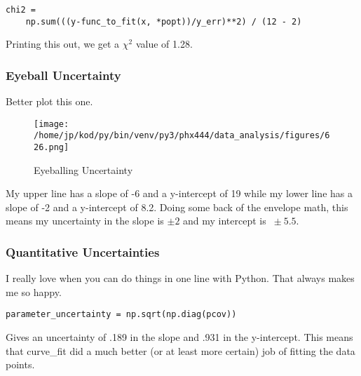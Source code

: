 \documentclass{article}
\begin{document}
\begin{center}
\begin{minipage}[t]{.85\textwidth}
    \begin{verbatim}
chi2 = 
    np.sum(((y-func_to_fit(x, *popt))/y_err)**2) / (12 - 2)
\end{verbatim}
\end{minipage}
\end{center}

Printing this out, we get a $\chi^2$ value of 1.28.

\subsubsection{Eyeball Uncertainty}
Better plot this one.
\begin{figure}[H]
        \begin{center}
        \texttt{[image: /home/jp/kod/py/bin/venv/py3/phx444/data\_analysis/figures/626.png]}
        \caption{Eyeballing Uncertainty}
        \label{fig:fig_19}
        \end{center}
\end{figure}

My upper line has a slope of -6 and a y-intercept of 19 while my lower line has
a slope of -2 and a y-intercept of 8.2. Doing some back of the envelope math,
this means my uncertainty in the slope is $\pm2$ and my intercept is $~\pm5.5$.

\subsubsection{Quantitative Uncertainties}

I really love when you can do things in one line with Python. That always makes
me so happy.

\begin{center}
\begin{minipage}[t]{.80\textwidth}
\begin{lstlisting}[frame=tlrb]
parameter_uncertainty = np.sqrt(np.diag(pcov))
\end{lstlisting}
\end{minipage}
\end{center}
Gives an uncertainty of .189 in the slope and .931 in the y-intercept. This
means that curve\_fit did a much better (or at least more certain) job of
fitting the data points.
\end{document}

